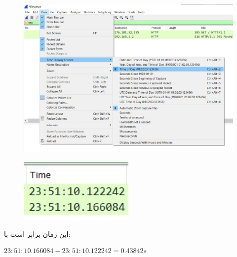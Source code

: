 \documentclass{article}
\begin{document}
\begin{figure}[H]
    \centering
    \includegraphics[width=1.0\textwidth]{figures/14.jpg}
    \caption{}
    \label{fig:fig1}
\end{figure}
\begin{figure}[H]
    \centering
    \includegraphics[width=0.5\textwidth]{figures/15.jpg}
    \caption{}
    \label{fig:fig1}
\end{figure}
این زمان برابر است با:
\begin{latin}
$
23:51:10.166084 - 23:51:10.122242 = 0.43842 s
$
\end{latin}
\end{document}
